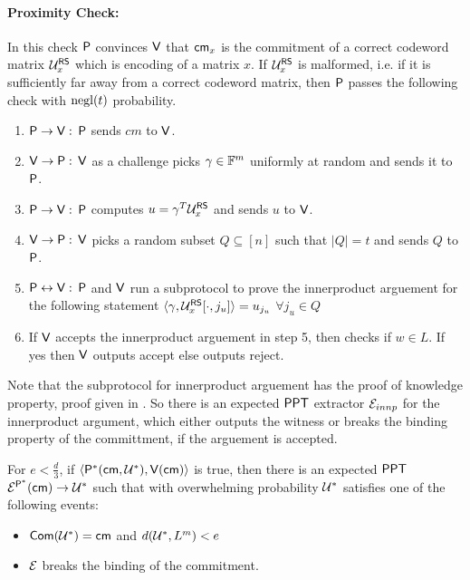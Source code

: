 \paragraph{\textbf{Proximity Check:}}\label{sec:proximity} In this check $\mathsf{P}$ convinces $\mathsf{V}$ that $\mathsf{cm}_x$ is the commitment of a correct codeword matrix $\mathcal{U}^{\mathsf{RS}}_x$ which is encoding of a matrix $x$. If $\mathcal{U}^{\mathsf{RS}}_x$ is malformed, i.e. if it is sufficiently far away from a correct codeword matrix, then $\mathsf{P}$ passes the following check with $\mathrm{negl}(t)$ probability.
\begin{enumerate}
	\item $\mathsf{P} \rightarrow \mathsf{V} :$ $\mathsf{P}$ sends $cm$ to $\mathsf{V}$.
	
	\item $\mathsf{V} \rightarrow \mathsf{P} :$ $\mathsf{V}$ as a challenge picks $\gamma \in \mathbb{F}^m$ uniformly at random and sends it to $\mathsf{P}$.
	
	\item $\mathsf{P} \rightarrow \mathsf{V} :$ $\mathsf{P}$ computes $u=\gamma^T\mathcal{U}^{\mathsf{RS}}_x$ and sends $u$ to $\mathsf{V}$.
	
	\item $\mathsf{V} \rightarrow \mathsf{P} :$ $\mathsf{V}$ picks a random subset $Q\subseteq [n]$ such that $|Q|=t$ and sends $Q$ to $\mathsf{P}$.
	
	\item $\mathsf{P} \leftrightarrow \mathsf{V}: $ $\mathsf{P}$ and $\mathsf{V}$ run a subprotocol to prove the innerproduct arguement for the following statement $\langle \gamma,\mathcal{U}^{\mathsf{RS}}_x[\cdot,j_u]\rangle=u_{j_u}$ $\forall j_u\in Q$
	
	\item If $\mathsf{V}$ accepts the innerproduct arguement in step 5, then checks if $w\in L$. If yes then $\mathsf{V}$ outputs accept else outputs reject.
\end{enumerate}

Note that the subprotocol for innerproduct arguement has the proof of knowledge property, proof given in \cite{Bulletproofs}. So there is an expected $\mathsf{PPT}$ extractor $\mathcal{E}_{innp}$ for the innerproduct argument, which either outputs the witness or breaks the binding property of the committment, if the arguement is accepted.
\begin{theorem}\label{theo:proximity}
	For $e < \frac{d}{3} $, if $\langle \mathsf{P}^*(\mathsf{cm}, \mathcal{U}^*),\mathsf{V}(\mathsf{cm})\rangle $ is true, then there is an expected $\mathsf{PPT}$ $\mathcal{E}^{\mathsf{P}^*}(\mathsf{cm}) \rightarrow \mathcal{U}^*$ such that with overwhelming probability $\mathcal{U}^*$ satisfies one of the following events: 
	\begin{itemize}
		\item $\mathsf{Com}(\mathcal{U}^*) = \mathsf{cm}$ and $ d(\mathcal{U}^*, L^m) < e$
		\item $\mathcal{E}$ breaks the binding of the commitment. 
	\end{itemize} 
	
\end{theorem}

